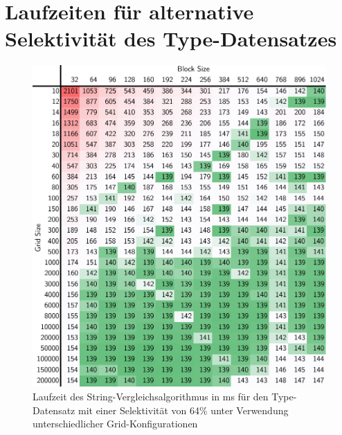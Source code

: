 


\chapter{Laufzeiten für alternative Selektivität des Type-Datensatzes}
\label{apx:parameter64}

\begin{figure}[ht]
	\includegraphics[]{bilder/parameter64.pdf}
	\caption{Laufzeit des String-Vergleichsalgorithmus in ms für den Type-Datensatz mit einer Selektivität von 64\% unter Verwendung unterschiedlicher Grid-Konfigurationen}
\end{figure}